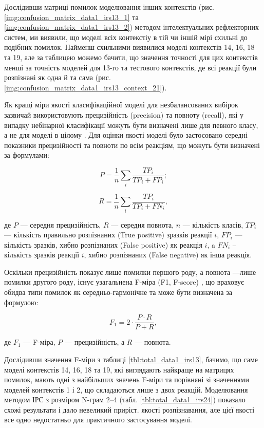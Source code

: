 Дослідивши матриці помилок моделювання інших контекстів (рис. \ref{img:confusion_matrix_data1_irs13_1} та \ref{img:confusion_matrix_data1_irs13_2}) методом інтелектуальних рефлекторних систем, ми виявили, що моделі всіх контекстіу в тій чи іншій мірі схильні до подібних помилок. Найменш схильними виявилися моделі контекстів 14, 16, 18 та 19, але за таблицею можемо бачити, що значення точності для цих контекстів менші за точність моделей для 13-го та тестового контекстів, де всі реакції були розпізнані як одна й та сама (рис. \ref{img:confusion_matrix_data1_irs13_context_21}).

Як кращі міри якості класифікаційної моделі для незбалансованих вибірок зазвичай використовують прецизійність (precision) та повноту (recall), які у випадку небінарної класифікації можуть бути визначені лише для певного класу, а не для моделі в цілому \cite{Powers_2011}. Для оцінки якості моделі було застосовано середні показники прецизійності та повноти по всім реакціям, що можуть бути визначені за формулами:

\begin{equation}
\label{eq:рrecision}
P=\frac{1}{n}\sum\limits_i\frac{TP_i}{TP_i+FP_i};
\end{equation}

\begin{equation}
\label{eq:recall}
R=\frac{1}{n}\sum\limits_i\frac{TP_i}{TP_i+FN_i},
\end{equation}

де $P$ --- середня прецизійність, $R$ --- середня повнота, $n$ --- кількість класів, $TP_i$ --- кількість правильно розпізнаних (True positive) зразків реакції $i$, $FP_i$ --- кількість зразків, хибно розпізнаних (False positive) як реакція $i$, a $FN_i$ -- кількість зразків реакції $i$, хибно розпізнаних (False negative) як інша реакція.

Оскільки прецизійність показує лише помилки першого роду, а повнота ---лише помилки другого роду, існує узагальнена F-міра (F1, F-score) \cite{Powers_2011,Sasaki_2007}, що враховує обидва типи помилок як середньо-гармонічне та може бути визначена за формулою:

\begin{equation}
\label{eq:f1}
F_1 = 2 \cdot \frac{P \cdot R}{P + R},
\end{equation}

де $F_1$ --- F-міра, $P$ --- прецизійність, а $R$ --- повнота.

Дослідивши значення F-міри з таблиці \ref{tbl:total_data1_irs13}, бачимо, що саме моделі контекстів 14, 16, 18 та 19, які виглядають найкраще на матрицях помилок, мають одні з найбільших значень F-міри та порівняні зі значеннями моделей контекстів 1 і 2, що складаються лише з двох реакцій. Моделювання методом ІРС з розміром N-грам 2–4 (табл. \ref{tbl:total_data1_irs24}) показало схожі результати і дало невеликий приріст. якості розпізнавання, але цієї якості все одно недостатньо для практичного застосування моделі.

